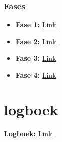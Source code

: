 \documentclass[12pt]{article}
\begin{document}
\subsubsection*{Fases}
\noindent\begin{itemize}
    \item \textbf{Fase 1: }\href{https://docs.google.com/document/d/1GbDkCxC9d_qvIaFt9WLgdqDdbehZgxvDl6xok6A8UG4}{Link} 
    \item \textbf{Fase 2: }\href{https://docs.google.com/document/d/1dRJIgrINIqM23WWmCmnGbnBuHpgw_vz0cuFKtMpCIMs}{Link} 
    \item \textbf{Fase 3: }\href{https://docs.google.com/document/d/1c8uWC6ebqpnVRqx3ldwISSlsHXozZ7VrJujyB8FCNq4}{Link} 
    \item \textbf{Fase 4: }\href{https://docs.google.com/document/d/1G-Xw7bRIdZ-OzQIb8x2kHXSOT6rMff9jRx3bLR63h5I}{Link} 
\end{itemize}

\pagebreak
\section{logboek}
\noindent\textbf{Logboek: }\href{https://docs.google.com/spreadsheets/d/1iMSadKjVQ10j7RvIdU1Dxt36Q_K4ckz7q1kMr5_YCWw/edit?usp=sharing}{Link} 
\end{document}

